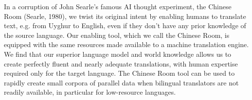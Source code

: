 In a corruption of John Searle's famous AI thought experiment, the Chinese Room (Searle, 1980), we twist its original intent by enabling humans to translate text, e.g. from Uyghur to English, even if they don't have any prior knowledge of the source language. Our enabling tool, which we call the Chinese Room, is equipped with the same resources made available to a machine translation engine. We find that our superior language model and world knowledge allows us to create perfectly fluent and nearly adequate translations, with human expertise required only for the target language. The Chinese Room tool can be used to rapidly create small corpora of parallel data when bilingual translators are not readily available, in particular for low-resource languages.
